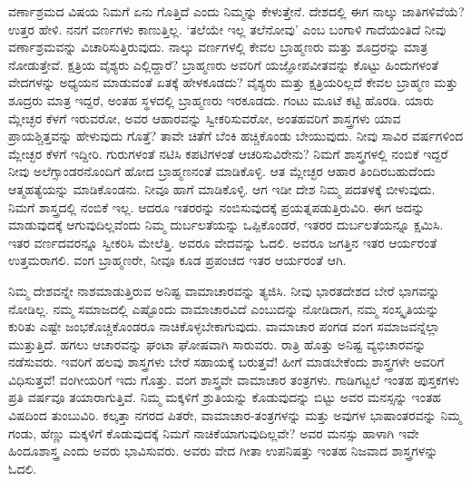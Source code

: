 ವರ್ಣಾಶ್ರಮದ ವಿಷಯ ನಿಮಗೆ ಏನು ಗೊತ್ತಿದೆ ಎಂದು ನಿಮ್ಮನ್ನು ಕೇಳುತ್ತೇನೆ. ದೇಶದಲ್ಲಿ ಈಗ ನಾಲ್ಕು ಜಾತಿಗಳಿವೆಯೆ? ಉತ್ತರ ಹೇಳಿ. ನನಗೆ ವರ್ಣಗಳು ಕಾಣುತ್ತಿಲ್ಲ. ‘ತಲೆಯೇ ಇಲ್ಲ ತಲೆನೋವು’ ಎಂಬ ಬಂಗಾಳಿ ಗಾದೆಯಂತಿದೆ ನೀವು ವರ್ಣಾಶ್ರಮವನ್ನು ವಿಚಾರಿಸುತ್ತಿರುವುದು. ನಾಲ್ಕು ವರ್ಣಗಳಲ್ಲಿ ಕೇವಲ ಬ್ರಾಹ್ಮಣರು ಮತ್ತು ಶೂದ್ರರನ್ನು ಮಾತ್ರ ನೋಡುತ್ತೇವೆ. ಕ್ಷತ್ರಿಯ ವೈಶ್ಯರು ಎಲ್ಲಿದ್ದಾರೆ? ಬ್ರಾಹ್ಮಣರು ಅವರಿಗೆ ಯಜ್ಞೋಪವೀತವನ್ನು ಕೊಟ್ಟು ಹಿಂದುಗಳಂತೆ ವೇದಗಳನ್ನು ಅಧ್ಯಯನ ಮಾಡುವಂತೆ ಏತಕ್ಕೆ ಹೇಳಕೂಡದು? ವೈಶ್ಯರು ಮತ್ತು ಕ್ಷತ್ರಿಯರಿಲ್ಲದೆ ಕೇವಲ ಬ್ರಾಹ್ಮಣ ಮತ್ತು ಶೂದ್ರರು ಮಾತ್ರ ಇದ್ದರೆ, ಅಂತಹ ಸ್ಥಳದಲ್ಲಿ ಬ್ರಾಹ್ಮಣರು ಇರಕೂಡದು. ಗಂಟು ಮೂಟೆ ಕಟ್ಟಿ ಹೊರಡಿ. ಯಾರು ಮ್ಲೇಚ್ಛರ ಕೆಳಗೆ ಇರುವರೋ, ಅವರ ಆಹಾರವನ್ನು ಸ್ವೀಕರಿಸುವರೋ, ಅಂತಹವರಿಗೆ ಶಾಸ್ತ್ರಗಳು ಯಾವ ಪ್ರಾಯಶ್ಚಿತ್ತವನ್ನು ಹೇಳುವುದು ಗೊತ್ತೆ? ತಾವೇ ಚಿತೆಗೆ ಬೆಂಕಿ ಹಚ್ಚಿಕೊಂಡು ಬೇಯುವುದು. ನೀವು ಸಾವಿರ ವರ್ಷಗಳಿಂದ ಮ್ಲೇಚ್ಛರ ಕೆಳಗೆ ಇದ್ದೀರಿ. ಗುರುಗಳಂತೆ ನಟಿಸಿ ಕಪಟಿಗಳಂತೆ ಆಚರಿಸುವಿರೇನು? ನಿಮಗೆ ಶಾಸ್ತ್ರಗಳಲ್ಲಿ ನಂಬಿಕೆ ಇದ್ದರೆ ನೀವು ಅಲೆಗ್ಸಾಂಡರನೊಂದಿಗೆ ಹೋದ ಬ್ರಾಹ್ಮಣನಂತೆ ಮಾಡಿಕೊಳ್ಳಿ. ಆತ ಮ್ಲೇಚ್ಛರ ಆಹಾರ ತಿಂದಿರಬಹುದೆಂದು ಆತ್ಮಹತ್ಯೆಯನ್ನು ಮಾಡಿಕೊಂಡನು. ನೀವೂ ಹಾಗೆ ಮಾಡಿಕೊಳ್ಳಿ. ಆಗ ಇಡೀ ದೇಶ ನಿಮ್ಮ ಪದತಳಕ್ಕೆ ಬೀಳುವುದು. ನಿಮಗೆ ಶಾಸ್ತ್ರದಲ್ಲಿ ನಂಬಿಕೆ ಇಲ್ಲ. ಆದರೂ ಇತರರನ್ನು ನಂಬಿಸುವುದಕ್ಕೆ ಪ್ರಯತ್ನಪಡುತ್ತಿರುವಿರಿ. ಈಗ ಅದನ್ನು ಮಾಡುವುದಕ್ಕೆ ಆಗುವುದಿಲ್ಲವೆಂದು ನಿಮ್ಮ ದುರ್ಬಲತೆಯನ್ನು ಒಪ್ಪಿಕೊಂಡರೆ, ಇತರರ ದುರ್ಬಲತೆಯನ್ನೂ ಕ್ಷಮಿಸಿ. ಇತರ ವರ್ಣದವರನ್ನೂ ಸ್ವೀಕರಿಸಿ ಮೇಲೆತ್ತಿ. ಅವರೂ ವೇದವನ್ನು ಓದಲಿ. ಅವರೂ ಜಗತ್ತಿನ ಇತರ ಆರ್ಯರಂತೆ ಉತ್ತಮರಾಗಲಿ. ವಂಗ ಬ್ರಾಹ್ಮಣರೇ, ನೀವೂ ಕೂಡ ಪ್ರಪಂಚದ ಇತರ ಆರ್ಯರಂತೆ ಆಗಿ.

ನಿಮ್ಮ ದೇಶವನ್ನೇ ನಾಶಮಾಡುತ್ತಿರುವ ಅನಿಷ್ಟ ವಾಮಾಚಾರವನ್ನು ತ್ಯಜಿಸಿ. ನೀವು ಭಾರತದೇಶದ ಬೇರೆ ಭಾಗವನ್ನು ನೋಡಿಲ್ಲ. ನಮ್ಮ ಸಮಾಜದಲ್ಲಿ ಎಷ್ಟೊಂದು ವಾಮಾಚಾರವಿದೆ ಎಂಬುದನ್ನು ನೋಡಿದಾಗ, ನಮ್ಮ ಸಂಸ್ಕೃತಿಯನ್ನು ಕುರಿತು ಎಷ್ಟೇ ಜಂಭಕೊಚ್ಚಿಕೊಂಡರೂ ನಾಚಿಕೊಳ್ಳಬೇಕಾಗುವುದು. ವಾಮಾಚಾರ ಪಂಗಡ ವಂಗ ಸಮಾಜವನ್ನೆಲ್ಲಾ ಮುತ್ತುತ್ತಿದೆ. ಹಗಲು ಆಚಾರವನ್ನು ಘಂಟಾ ಘೋಷವಾಗಿ ಸಾರುವರು. ರಾತ್ರಿ ಹೊತ್ತು ಅನಿಷ್ಟ ವ್ಯಭಿಚಾರವನ್ನು ನಡೆಸುವರು. ಇವರಿಗೆ ಹಲವು ಶಾಸ್ತ್ರಗಳು ಬೇರೆ ಸಹಾಯಕ್ಕೆ ಬರುತ್ತವೆ! ಹೀಗೆ ಮಾಡಬೇಕೆಂದು ಶಾಸ್ತ್ರಗಳೇ ಅವರಿಗೆ ವಿಧಿಸುತ್ತವೆ! ವಂಗೀಯರಿಗೆ ಇದು ಗೊತ್ತು. ವಂಗ ಶಾಸ್ತ್ರವೇ ವಾಮಾಚಾರ ತಂತ್ರಗಳು. ಗಾಡಿಗಟ್ಟಲೆ ಇಂತಹ ಪುಸ್ತಕಗಳು ಪ್ರತಿ ವರ್ಷವೂ ತಯಾರಾಗುತ್ತಿವೆ. ನಿಮ್ಮ ಮಕ್ಕಳಿಗೆ ಶ್ರುತಿಯನ್ನು ಕೊಡುವುದನ್ನು ಬಿಟ್ಟು ಅವರ ಮನಸ್ಸನ್ನು ಇಂತಹ ವಿಷದಿಂದ ತುಂಬುವಿರಿ. ಕಲ್ಕತ್ತಾ ನಗರದ ಪಿತರೇ, ವಾಮಾಚಾರ-ತಂತ್ರಗಳನ್ನು ಮತ್ತು ಅವುಗಳ ಭಾಷಾಂತರವನ್ನು ನಿಮ್ಮ ಗಂಡು, ಹೆಣ್ಣು ಮಕ್ಕಳಿಗೆ ಕೊಡುವುದಕ್ಕೆ ನಿಮಗೆ ನಾಚಿಕೆಯಾಗುವುದಿಲ್ಲವೇ? ಅವರ ಮನಸ್ಸು ಹಾಳಾಗಿ ಇವೇ ಹಿಂದೂಶಾಸ್ತ್ರ ಎಂದು ಅವರು ಭಾವಿಸುವರು. ಅವರು ವೇದ ಗೀತಾ ಉಪನಿಷತ್ತು ಇಂತಹ ನಿಜವಾದ ಶಾಸ್ತ್ರಗಳನ್ನು ಓದಲಿ.

